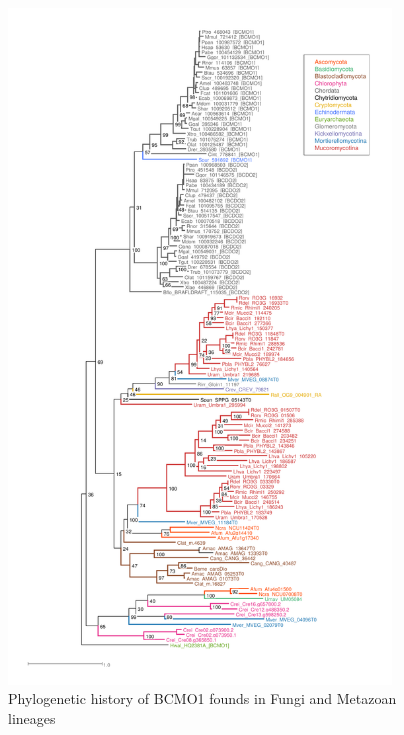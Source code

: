 \begin{figure}[tbp]
  \includegraphics[width=4in]{./Chapter_Coelomomyces/img/BCMO1DO2.png}
  \caption[BCMO1 history]{Phylogenetic history of BCMO1 founds in Fungi and Metazoan lineages}
  \label{fig:ChClat_BCMO1DO2}
\end{figure}

